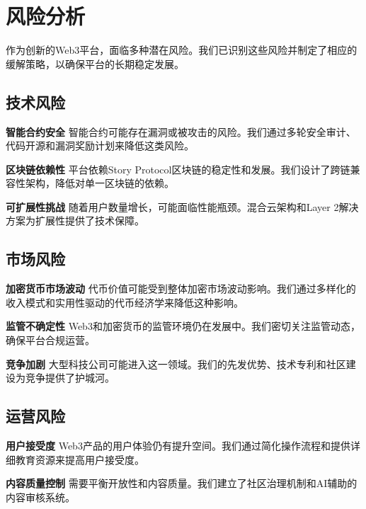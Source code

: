 \section{风险分析}\label{sec:risk-analysis-cn}

作为创新的Web3平台，\storyhouse{}面临多种潜在风险。我们已识别这些风险并制定了相应的缓解策略，以确保平台的长期稳定发展。

\subsection{技术风险}

\textbf{智能合约安全}
智能合约可能存在漏洞或被攻击的风险。我们通过多轮安全审计、代码开源和漏洞奖励计划来降低这类风险。

\textbf{区块链依赖性}
平台依赖Story Protocol区块链的稳定性和发展。我们设计了跨链兼容性架构，降低对单一区块链的依赖。

\textbf{可扩展性挑战}
随着用户数量增长，可能面临性能瓶颈。混合云架构和Layer 2解决方案为扩展性提供了技术保障。

\subsection{市场风险}

\textbf{加密货币市场波动}
\tip{}代币价值可能受到整体加密市场波动影响。我们通过多样化的收入模式和实用性驱动的代币经济学来降低这种影响。

\textbf{监管不确定性}
Web3和加密货币的监管环境仍在发展中。我们密切关注监管动态，确保平台合规运营。

\textbf{竞争加剧}
大型科技公司可能进入这一领域。我们的先发优势、技术专利和社区建设为竞争提供了护城河。

\subsection{运营风险}

\textbf{用户接受度}
Web3产品的用户体验仍有提升空间。我们通过简化操作流程和提供详细教育资源来提高用户接受度。

\textbf{内容质量控制}
需要平衡开放性和内容质量。我们建立了社区治理机制和AI辅助的内容审核系统。